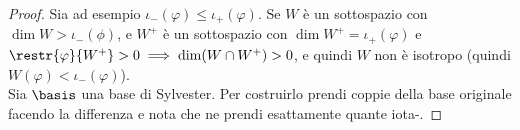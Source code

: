 \documentclass[11pt]{article}
\begin{document}
	\begin{proof}
		Sia ad esempio $\iota_-(\varphi) \leq \iota_+(\varphi)$. Se $W$
		è un sottospazio con $\dim W > \iota_-(\phi)$, e $W^+$ è
		un sottospazio con $\dim W^+ = \iota_+(\varphi)$ e $\restr{\varphi}{W^+} > 0 \implies \dim (W \cap W^+) > 0$,
		e quindi $W$ non è isotropo (quindi $W(\varphi) < \iota_-(\varphi)$). \\
		
		Sia $\basis$ una base di Sylvester. Per costruirlo prendi
		coppie della base originale facendo la differenza e nota
		che ne prendi esattamente quante iota-.
	\end{proof}
\end{document}
